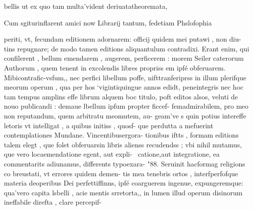 \documentclass{article}
\begin{document}
bellis ut ex quo tam multa'vident deriuatatheoremata,

Cum sgiturinflarent amici now Librarij tantum, fedetiam Phslofophia

periti, vt, fecundam editionem adornarem: officij quidem mei putawi , non diu-
tins repugnare; de modo tamen editions aliquantulum contradixi. Erant
enim, qui confilerent , bellum emendarem , augerem, perficerem : morem
Seiler caterorum Authorum , quem tenent in excolendis libres propriss em ipfé
obferuarem. Mibicontrafic-vsfum,, nec perfici libellum poffe, nifttranferiprss
in illum plerifque meorum operum , qua per hos ‘vigintiquingue annos edidt,
peneintegris nec hoc tam tempus amplins effe librum alquem boc titulo, poft
editos alsos, veluti de nouo publicandi : demaue lbellum ipfum propter ficcef-
femadmirabilem, pro meo non reputandum, quem arbitratu meomutem, au-
geam've s quin potius intereffe letoris vt intelligat , a quibus initiss , quosf-
que perdutta a mefuerint contemplationes Mundane. Vincentibusergora-
tionibus iftts , formam editions talem elegt , que folet obferuarsin libris alienss
recudendss ; vbi nihil mutamus, que vero locaemendatione egent, aut expli-~
catione,aut integratione, ea commentarits adiunamus, differents typoexara-
"88. Seruinit hacformag religions co breustati, vt errores quidem demen-
tis mea tenebris ortos , interfperfofque materia deoperibus Dei perfettiffinns,
ipfé coarguerem ingenue, expungeremque: qua'vero capita lsbelli , acie mentis
srretorta,, in lumen illud operum disinorum ineffabile direfta , clare percepif-
\end{document}
